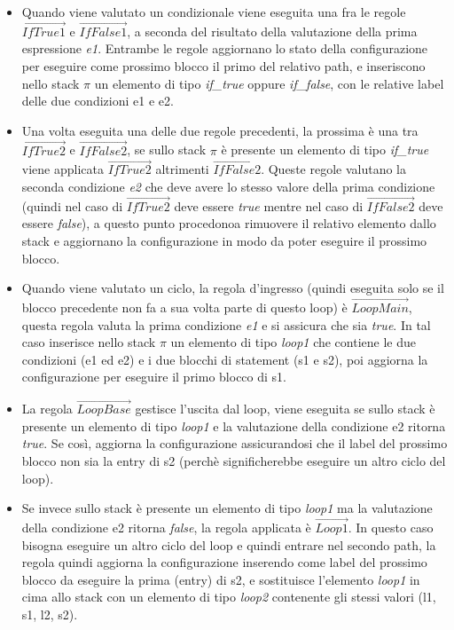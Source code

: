 \documentclass{article}
\theoremstyle{plain}
\theoremstyle{definition}
\theoremstyle{plain}
\newcommand{\s}{\pi}
\begin{document}
\begin{itemize}

\item Quando viene valutato un condizionale viene eseguita una fra le regole $\overrightarrow{\mathit{IfTrue1}}$ e $\overrightarrow{\mathit{IfFalse1}}$, a seconda del risultato della valutazione della prima espressione \emph{e1}. Entrambe le regole aggiornano lo stato della configurazione per eseguire come prossimo blocco il primo del relativo path, e inseriscono nello stack $\s$ un elemento di tipo \emph{if\_true} oppure \emph{if\_false}, con le relative label delle due condizioni e1 e e2.

\item Una volta eseguita una delle due regole precedenti, la prossima è una tra $\overrightarrow{\mathit{IfTrue2}}$ e $\overrightarrow{\mathit{IfFalse2}}$, se sullo stack $\s$ è presente un elemento di tipo \emph{if\_true} viene applicata $\overrightarrow{\mathit{IfTrue2}}$ altrimenti $\overrightarrow{\mathit{IfFalse2}}$. Queste regole valutano la seconda condizione \emph{e2} che deve avere lo stesso valore della prima condizione (quindi nel caso di $\overrightarrow{\mathit{IfTrue2}}$ deve essere \emph{true} mentre nel caso di $\overrightarrow{\mathit{IfFalse2}}$ deve essere \emph{false}), a questo punto procedonoa  rimuovere il relativo elemento dallo stack e aggiornano la configurazione in modo da poter eseguire il prossimo blocco.

\item Quando viene valutato un ciclo, la regola d'ingresso (quindi eseguita solo se il blocco precedente non fa a sua volta parte di questo loop) è $\overrightarrow{\mathit{LoopMain}}$, questa regola valuta la prima condizione \emph{e1} e si assicura che sia \emph{true}. In tal caso inserisce nello stack $\s$ un elemento di tipo \emph{loop1} che contiene le due condizioni (e1 ed e2) e i due blocchi di statement (s1 e s2), poi aggiorna la configurazione per eseguire il primo blocco di s1.

\item La regola $\overrightarrow{\mathit{LoopBase}}$ gestisce l'uscita dal loop, viene eseguita se sullo stack è presente un elemento di tipo \emph{loop1} e la valutazione della condizione e2 ritorna \emph{true}. Se così, aggiorna la configurazione assicurandosi che il label del prossimo blocco non sia la entry di s2 (perchè significherebbe eseguire un altro ciclo del loop).

\item Se invece sullo stack è presente un elemento di tipo \emph{loop1} ma la valutazione della condizione e2 ritorna \emph{false}, la regola applicata è $\overrightarrow{\mathit{Loop1}}$. In questo caso bisogna eseguire un altro ciclo del loop e quindi entrare nel secondo path, la regola quindi aggiorna la configurazione inserendo come label del prossimo blocco da eseguire la prima (entry) di s2, e sostituisce l'elemento \emph{loop1} in cima allo stack con un elemento di tipo \emph{loop2} contenente gli stessi valori (l1, s1, l2, s2).


\end{itemize}
\end{document}
